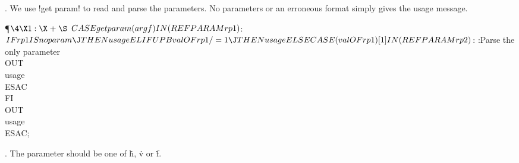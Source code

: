 . We use !get param! to read and parse the parameters. No parameters
or an erroneous format simply gives the usage message.

\Y\P$\4\X1:\X\mathrel{+}\S$\6
\4$\\{CASE}\\{get}\\{param}(\\{argf})\\{IN}(\\{REF}\\{PARAM}\\{rp1})$: $%
\\{IF}\\{rp1}\\{IS}\\{no}\\{param}\J\\{THEN}\\{usage}\\{ELIF}\\{UPB}\\{val}%
\\{OF}\\{rp1}/=1\J\\{THEN}\\{usage}\\{ELSE}\\{CASE}(\\{val}\\{OF}\\{rp1})[1]%
\\{IN}(\\{REF}\\{PARAM}\\{rp2})$: :Parse the only parameter\X\\{OUT}%
\\{usage}\\{ESAC}\\{FI}\\{OUT}\\{usage}\\{ESAC};\par
\fi

. The parameter should be one of \.{h}, \.{v} or \.{f}.

